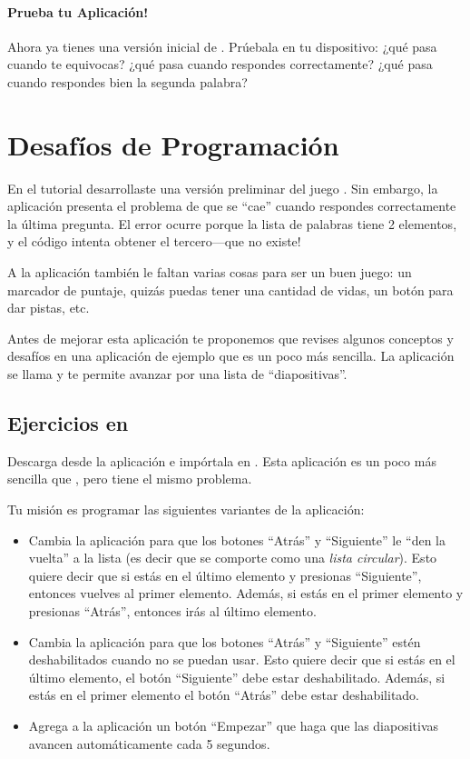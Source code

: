 \paragraph{Prueba tu Aplicación!} Ahora ya tienes una versión inicial
de . Prúebala en tu dispositivo: ¿qué pasa cuando te
equivocas? ¿qué pasa cuando respondes correctamente? ¿qué pasa cuando
respondes bien la segunda palabra?

\section{Desafíos de Programación}

En el tutorial desarrollaste una versión preliminar del juego
. Sin embargo, la aplicación presenta el problema de que
se ``cae'' cuando respondes correctamente la última pregunta. El error
ocurre porque la lista de palabras tiene 2 elementos, y el código
intenta obtener el tercero---que no existe!

A la aplicación también le faltan varias cosas para ser un buen juego:
un marcador de puntaje, quizás puedas tener una cantidad de vidas, un
botón para dar pistas, etc.

Antes de mejorar esta aplicación te proponemos que revises algunos
conceptos y desafíos en una aplicación de ejemplo que es un poco más
sencilla. La aplicación se llama  y te permite
avanzar por una lista de ``diapositivas''.

\subsection*{Ejercicios en }

Descarga desde  la aplicación
 e impórtala en \AppInventor. Esta aplicación es un
poco más sencilla que , pero tiene el mismo problema.

Tu misión es programar las siguientes variantes de la aplicación:

\begin{itemize}

\item Cambia la aplicación para que los botones ``Atrás'' y
  ``Siguiente'' le ``den la vuelta'' a la lista (es decir que se
  comporte como una \emph{lista circular}). Esto quiere decir que si
  estás en el último elemento y presionas ``Siguiente'', entonces
  vuelves al primer elemento. Además, si estás en el primer elemento y
  presionas ``Atrás'', entonces irás al último elemento.

\item Cambia la aplicación para que los botones ``Atrás'' y
  ``Siguiente'' estén deshabilitados cuando no se puedan usar. Esto
  quiere decir que si estás en el último elemento, el botón
  ``Siguiente'' debe estar deshabilitado. Además, si estás en el
  primer elemento el botón ``Atrás'' debe estar deshabilitado.

\item Agrega a la aplicación un botón ``Empezar'' que haga que las
  diapositivas avancen automáticamente cada 5 segundos.

\end{itemize}

